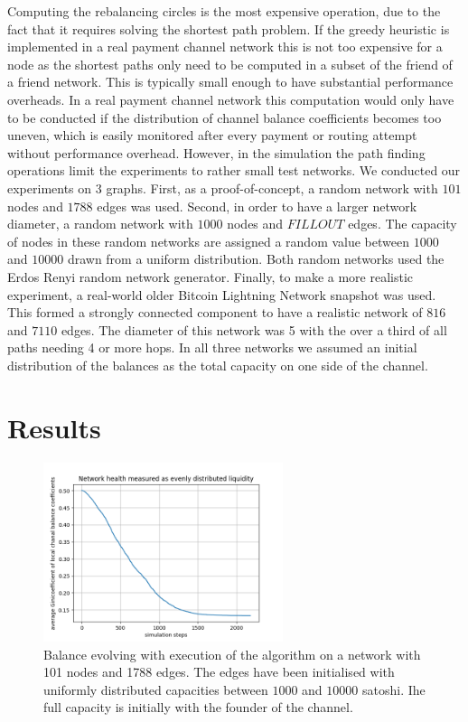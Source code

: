 \documentclass[a4paper]{paper}
\begin{document}
Computing the rebalancing circles is the most expensive operation, due to the fact that it requires solving the shortest path problem.
If the greedy heuristic is implemented in a real payment channel network this is not too expensive for a node as the shortest paths only need to be computed in a subset of the friend of a friend network.
This is typically small enough to have substantial performance overheads. 
In a real payment channel network this computation would only have to be conducted 
if the distribution of channel balance coefficients becomes too uneven,
which is easily monitored after every payment or routing attempt without performance overhead.
However, in the simulation the path finding operations limit the experiments to rather small test networks.
We conducted our experiments on 3 graphs.
First, as a proof-of-concept, a random network with $101$ nodes and $1788$ edges was used.
Second, in order to have a larger network diameter, a random network with $1000$ nodes and $FILLOUT$ edges.
The capacity of nodes in these random networks are assigned a random value between $1000$ and $10000$ drawn from a uniform distribution.
Both random networks used the Erdos Renyi random network generator.
Finally, to make a more realistic experiment, a real-world older Bitcoin Lightning Network snapshot was used. 
This formed a strongly connected component to have a realistic network of $816$ and $7110$ edges.
The diameter of this network was 5 with the over a third of all paths needing 4 or more hops.
In all three networks we assumed an initial distribution of the balances as the total capacity on one side of the channel.


\section{Results}
\label{sec:results}

\begin{figure}
 \centering
 \includegraphics[width=7cm]{code/results/routabilityTest/1574847007_figure.png}
 \caption{Balance evolving with execution of the algorithm on a network with 101 nodes and 1788 edges. The edges have been initialised with uniformly distributed capacities between $1000$ and $10000$ satoshi. Ihe full capacity is initially with the founder of the channel.}
 \label{fig:healthovertime}
\end{figure}
\end{document}
